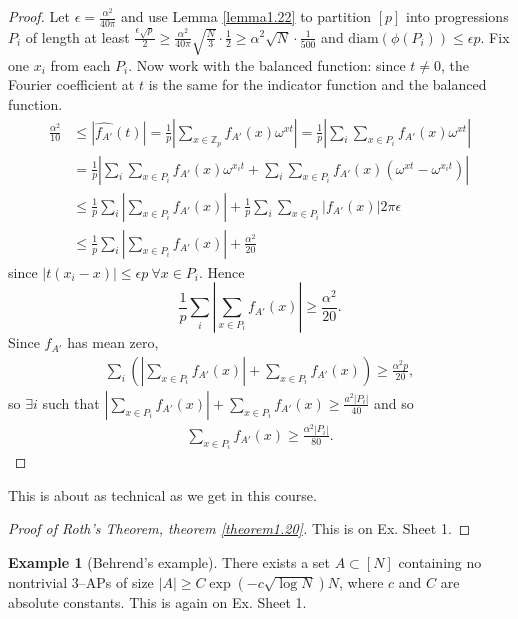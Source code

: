 \documentclass{article}
\theoremstyle{definition}
\newtheorem{example}[theorem]{Example}
\begin{document}
\begin{proof}
    Let $\epsilon = \frac{\alpha^2}{40\pi}$ and use Lemma \ref{lemma1.22} to partition $[p]$ into progressions $P_i$ of length at least $\frac{\epsilon\sqrt{p}}{2} \ge \frac{\alpha^2}{40\pi}\sqrt{\frac{N}{3}}\cdot \frac{1}{2} \ge \alpha^2\sqrt{N}\cdot \frac{1}{500}$ and $\text{diam}(\phi(P_i))\le \epsilon p$. Fix one $x_i$ from each $P_i$. Now work with the balanced function: since $t\neq 0$, the Fourier coefficient at $t$ is the same for the indicator function and the balanced function.
    \begin{align*}
        \frac{\alpha^2}{10} &\le \left|\widehat{f_{A'}}(t) \right| = \frac{1}{p}\left|\sum_{x \in \mathbb{Z}_p}^{} f_{A'}(x)\omega^{xt}\right| = \frac{1}{p}\left|\sum_{i}^{} \sum_{x \in P_i}^{} f_{A'}(x)\omega^{xt} \right| \\
        &=\frac{1}{p}\left|\sum_{i}^{} \sum_{x \in P_i}^{} f_{A'}(x)\omega^{x_it} + \sum_{i}^{} \sum_{x \in P_i}^{} f_{A'}(x)\left(\omega^{xt}-\omega^{x_it}\right) \right| \\
        &\le \frac{1}{p}\sum_{i}^{} \left|\sum_{x \in P_i}^{} f_{A'}(x) \right| + \frac{1}{p}\sum_{i}^{} \sum_{x \in P_i}^{} \left|f_{A'}(x) \right|2\pi \epsilon \\
        &\le \frac{1}{p}\sum_{i}^{} \left|\sum_{x \in P_i}^{} f_{A'}(x) \right| + \frac{\alpha^2}{20}
    \end{align*}
    since $\left|t(x_i-x) \right|\le \epsilon p ~\forall x \in P_i$. Hence $$\frac{1}{p}\sum_{i}^{} \left|\sum_{x \in P_i}^{} f_{A'}(x) \right| \ge \frac{\alpha^2}{20}.$$
    Since $f_{A'}$ has mean zero, 
    \begin{align*}
        \sum_{i}^{} \left(\left|\sum_{x \in P_i}^{} f_{A'}(x) \right| + \sum_{x \in P_i}^{} f_{A'}(x) \right) \ge \frac{\alpha^2 p}{20},
    \end{align*}
    so $\exists i$ such that $\left|\sum_{x \in P_i}^{} f_{A'}(x) \right| + \sum_{x \in P_i}^{} f_{A'}(x) \ge \frac{a^2\left|P_i \right|}{40}$ and so 
    \begin{align*}
        \sum_{x \in P_i}^{} f_{A'}(x) \ge \frac{\alpha^2 \left|P_i \right|}{80}.
    \end{align*}
\end{proof}
This is about as technical as we get in this course.
\begin{proof}[Proof of Roth's Theorem, theorem \ref{theorem1.20}]
    This is on Ex. Sheet 1.
\end{proof}
\begin{example}[Behrend's example]
    There exists a set $A \subset [N]$ containing no nontrivial 3--APs of size $\left|A \right| \ge C \exp \left(-c \sqrt{\log N}\right)N$, where $c$ and $C$ are absolute constants. This is again on Ex. Sheet 1.
\end{example}
\end{document}
